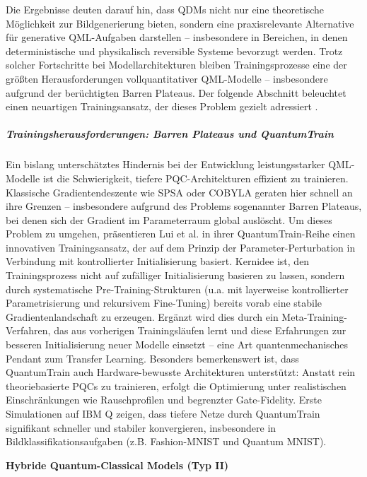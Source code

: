 Die Ergebnisse deuten darauf hin, dass QDMs nicht nur eine theoretische Möglichkeit zur Bildgenerierung bieten, sondern eine praxisrelevante Alternative für generative QML-Aufgaben darstellen – insbesondere in Bereichen, in denen deterministische und physikalisch reversible Systeme bevorzugt werden.
Trotz solcher Fortschritte bei Modellarchitekturen bleiben Trainingsprozesse eine der größten Herausforderungen vollquantitativer QML-Modelle – insbesondere aufgrund der berüchtigten Barren Plateaus. Der folgende Abschnitt beleuchtet einen neuartigen Trainingsansatz, der dieses Problem gezielt adressiert \cite{zhangGenerativeQuantumMachine2024}.

\noindent 



\subparagraph{Trainingsherausforderungen: Barren Plateaus und QuantumTrain}
Ein bislang unterschätztes Hindernis bei der Entwicklung leistungsstarker QML-Modelle ist die Schwierigkeit, tiefere PQC-Architekturen effizient zu trainieren. Klassische Gradientendeszente wie SPSA oder COBYLA geraten hier schnell an ihre Grenzen – insbesondere aufgrund des Problems sogenannter Barren Plateaus, bei denen sich der Gradient im Parameterraum global auslöscht. Um dieses Problem zu umgehen, präsentieren Lui et al. in ihrer QuantumTrain-Reihe einen innovativen Trainingsansatz, der auf dem Prinzip der Parameter-Perturbation in Verbindung mit kontrollierter Initialisierung basiert. \cite{liuQTRLPracticalQuantum2024}
Kernidee ist, den Trainingsprozess nicht auf zufälliger Initialisierung basieren zu lassen, sondern durch systematische Pre-Training-Strukturen (u.a. mit layerweise kontrollierter Parametrisierung und rekursivem Fine-Tuning) bereits vorab eine stabile Gradientenlandschaft zu erzeugen. Ergänzt wird dies durch ein Meta-Training-Verfahren, das aus vorherigen Trainingsläufen lernt und diese Erfahrungen zur besseren Initialisierung neuer Modelle einsetzt – eine Art quantenmechanisches Pendant zum Transfer Learning. \cite{liuQTRLPracticalQuantum2024}
Besonders bemerkenswert ist, dass QuantumTrain auch Hardware-bewusste Architekturen unterstützt: Anstatt rein theoriebasierte PQCs zu trainieren, erfolgt die Optimierung unter realistischen Einschränkungen wie Rauschprofilen und begrenzter Gate-Fidelity. Erste Simulationen auf IBM Q zeigen, dass tiefere Netze durch QuantumTrain signifikant schneller und stabiler konvergieren, insbesondere in Bildklassifikationsaufgaben (z.B. Fashion-MNIST und Quantum MNIST).


\vspace{1.5em}
\noindent\textbf{Hybride Quantum-Classical Models (Typ II)}

